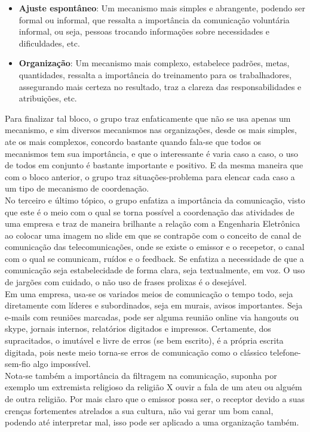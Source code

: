 \documentclass[oneside]{book}
\newcommand\tab[1][1cm]{\hspace*{#1}}
\theoremstyle{definition}
\begin{document}
            \begin{itemize}
                \item \textbf{Ajuste espontâneo}: Um mecanismo mais simples e abrangente, podendo ser formal ou informal, que ressalta a importância da comunicação voluntária informal, ou seja, pessoas trocando informações sobre necessidades e dificuldades, etc.
                \item \textbf{Organização}: Um mecanismo mais complexo, estabelece padrões, metas, quantidades, ressalta a importância do treinamento para os trabalhadores, assegurando mais certeza no resultado, traz a clareza das responsabilidades e atribuições, etc.
            \end{itemize}
            \tab Para finalizar tal bloco, o grupo traz enfaticamente que não se usa apenas um mecanismo, e sim diversos mecanismos nas organizações, desde os mais simples, ate os mais complexos, concordo bastante quando fala-se que todos os mecanismos tem sua importância, e que o interessante é varia caso a caso, o uso de todos em conjunto é bastante importante e positivo. E da mesma maneira que com o bloco anterior, o grupo traz situações-problema para elencar cada caso a um tipo de mecanismo de coordenação.\\
            \tab No terceiro e último tópico, o grupo enfatiza a importância da comunicação, visto que este é o meio com o qual se torna possível a coordenação das atividades de uma empresa e traz de maneira brilhante a relação com a Engenharia Eletrônica ao colocar uma imagem no slide em que se contrapõe com o conceito de canal de comunicação das telecomunicações, onde se existe o emissor e o recepetor, o canal com o qual se comunicam, ruídos e o feedback. Se enfatiza a necessidade de que a comunicação seja estabelecidade de forma clara, seja textualmente, em voz. O uso de jargões com cuidado, o não uso de frases prolixas é o desejável.\\
            \tab Em uma empresa, usa-se os variados meios de comunicação o tempo todo, seja diretamente com líderes e subordinados, seja em murais, avisos importantes. Seja e-mails com reuniões marcadas, pode ser alguma reunião online via hangouts ou skype, jornais internos, relatórios digitados e impressos. Certamente, dos supracitados, o imutável e livre de erros (se bem escrito), é a própria escrita digitada, pois neste meio torna-se erros de comunicação como o clássico telefone-sem-fio algo impossível.\\
            \tab Nota-se também a importância da filtragem na comunicação, suponha por exemplo um extremista religioso da religião X ouvir a fala de um ateu ou alguém de outra religião. Por mais claro que o emissor possa ser, o receptor devido a suas crenças fortementes atrelados a sua cultura, não vai gerar um bom canal, podendo até interpretar mal, isso pode ser aplicado a uma organização também.\\
\end{document}
